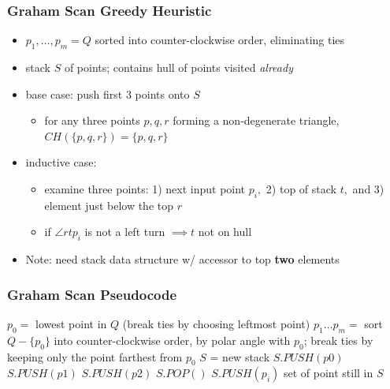 \documentclass{beamer}
\begin{document}
\begin{frame} \frametitle{Graham Scan Greedy Heuristic}
\begin{itemize}
  \item $p_1, \ldots, p_m = Q$ sorted into counter-clockwise order, eliminating ties
  \item stack $S$ of points; contains hull of points visited \emph{already}
  \item base case: push first 3 points onto $S$
  \begin{itemize}
    \item for any three points $p, q, r$ forming a non-degenerate triangle,
      $CH(\{p, q, r\}) = \{p, q, r\}$
    \end{itemize}
  \item inductive case:
    \begin{itemize}
      \item examine three points: 1) next input point $p_i,$ 2) top of
        stack $t,$ and 3) element just below the top $r$
        \item if $\angle r t p_i$ is not a left turn $\implies t$ not on hull
    \end{itemize}
  \item Note: need stack data structure w/ accessor to top \textbf{two} elements
  \end{itemize}
\end{frame}

\begin{frame} \frametitle{Graham Scan Pseudocode}
  {\small
\begin{algorithmic}[1]
   
    \State $p_0 = $ lowest point in $Q$ (break ties by choosing leftmost point)
    \State $p_1 \ldots p_m = $ sort $Q-\{p_0\}$ into counter-clockwise order,
      by polar angle with $p_0$; break ties by keeping only the point farthest from $p_0$
    \State $S$ = new stack
    \State $S.PUSH(p0)$
    \State $S.PUSH(p1)$
    \State $S.PUSH(p2)$
        \State $S.POP()$
      \EndWhile
      \State $S.PUSH(p_i)$
    \EndFor
    \State \Return set of point still in $S$
  \EndFunction
\end{algorithmic}
}
\end{frame}
\end{document}
